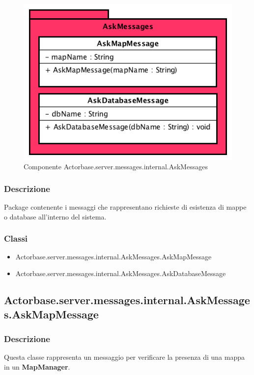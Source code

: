 \documentclass[a4paper]{article}
\begin{document}
			\begin{figure} [H]
				\centering
				\includegraphics[scale = 0.6]{ST/Server/AskMessages.png}
				\caption{Componente Actorbase.server.messages.internal.AskMessages}
			\end{figure}
			\subsubsection{Descrizione}
				Package contenente i messaggi che rappresentano richieste di esistenza di mappe o database all'interno del sistema.
				
			\subsubsection{Classi}
				\begin{itemize}
					\item Actorbase.server.messages.internal.AskMessages.AskMapMessage
					\item Actorbase.server.messages.internal.AskMessages.AskDatabaseMessage
				\end{itemize}
			
		\subsection{Actorbase.server.messages.internal.AskMessages.AskMapMessage}
			\subsubsection{Descrizione}
				Questa classe rappresenta un messaggio per verificare la presenza di una mappa in un \textbf{MapManager}.
				
\end{document}
